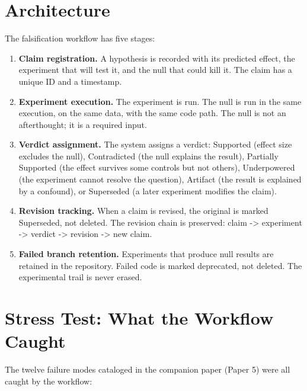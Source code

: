 \documentclass[11pt]{article}
\begin{document}
\section{Architecture}

The falsification workflow has five stages:

\begin{enumerate}
\item \textbf{Claim registration.} A hypothesis is recorded with its
predicted effect, the experiment that will test it, and the null that
could kill it. The claim has a unique ID and a timestamp.

\item \textbf{Experiment execution.} The experiment is run. The null is
run in the same execution, on the same data, with the same code path.
The null is not an afterthought; it is a required input.

\item \textbf{Verdict assignment.} The system assigns a verdict:
Supported (effect size excludes the null), Contradicted (the null
explains the result), Partially Supported (the effect survives some
controls but not others), Underpowered (the experiment cannot resolve
the question), Artifact (the result is explained by a confound), or
Superseded (a later experiment modifies the claim).

\item \textbf{Revision tracking.} When a claim is revised, the original
is marked Superseded, not deleted. The revision chain is preserved:
claim -> experiment -> verdict -> revision -> new claim.

\item \textbf{Failed branch retention.} Experiments that produce null
results are retained in the repository. Failed code is marked
deprecated, not deleted. The experimental trail is never erased.
\end{enumerate}

\section{Stress Test: What the Workflow Caught}

The twelve failure modes cataloged in the companion paper (Paper 5) were
all caught by the workflow:
\end{document}
